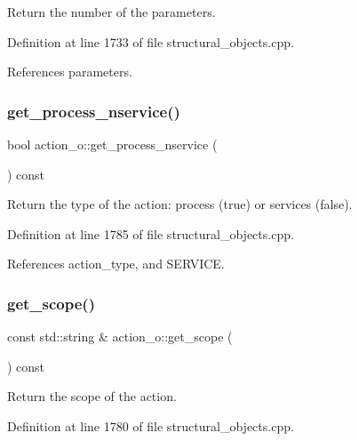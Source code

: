 Return the number of the parameters. 



Definition at line 1733 of file structural\+\_\+objects.\+cpp.



References parameters.

\mbox{\label{classaction__o_a8034744ad466f3a61fc2af50ef076925}} 
\subsubsection{\texorpdfstring{get\+\_\+process\+\_\+nservice()}{get\_process\_nservice()}}
{\footnotesize\ttfamily bool action\+\_\+o\+::get\+\_\+process\+\_\+nservice (\begin{DoxyParamCaption}{ }\end{DoxyParamCaption}) const}



Return the type of the action\+: process (true) or services (false). 



Definition at line 1785 of file structural\+\_\+objects.\+cpp.



References action\+\_\+type, and S\+E\+R\+V\+I\+CE.

\mbox{\label{classaction__o_aba261f3be11571b2161360f3ab56e21e}} 
\subsubsection{\texorpdfstring{get\+\_\+scope()}{get\_scope()}}
{\footnotesize\ttfamily const std\+::string \& action\+\_\+o\+::get\+\_\+scope (\begin{DoxyParamCaption}{ }\end{DoxyParamCaption}) const}



Return the scope of the action. 



Definition at line 1780 of file structural\+\_\+objects.\+cpp.




